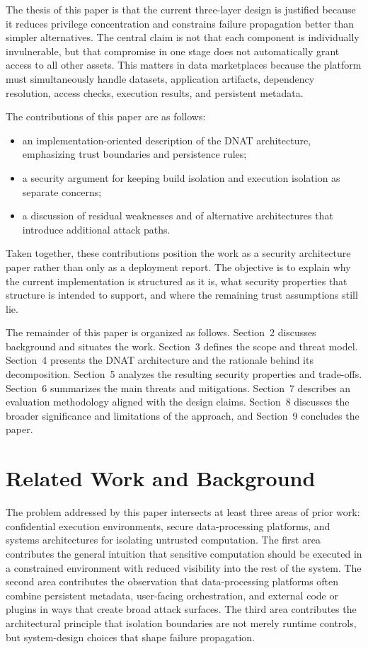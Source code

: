 \documentclass[sigconf,nonacm]{acmart}
\begin{document}
The thesis of this paper is that the current three-layer design is justified because it reduces privilege concentration and constrains failure propagation better than simpler alternatives. The central claim is not that each component is individually invulnerable, but that compromise in one stage does not automatically grant access to all other assets. This matters in data marketplaces because the platform must simultaneously handle datasets, application artifacts, dependency resolution, access checks, execution results, and persistent metadata.

The contributions of this paper are as follows:
\begin{itemize}
\item an implementation-oriented description of the DNAT architecture, emphasizing trust boundaries and persistence rules;
\item a security argument for keeping build isolation and execution isolation as separate concerns;
\item a discussion of residual weaknesses and of alternative architectures that introduce additional attack paths.
\end{itemize}

Taken together, these contributions position the work as a security architecture paper rather than only as a deployment report. The objective is to explain why the current implementation is structured as it is, what security properties that structure is intended to support, and where the remaining trust assumptions still lie.

The remainder of this paper is organized as follows. Section~2 discusses background and situates the work. Section~3 defines the scope and threat model. Section~4 presents the DNAT architecture and the rationale behind its decomposition. Section~5 analyzes the resulting security properties and trade-offs. Section~6 summarizes the main threats and mitigations. Section~7 describes an evaluation methodology aligned with the design claims. Section~8 discusses the broader significance and limitations of the approach, and Section~9 concludes the paper.

\section{Related Work and Background}

The problem addressed by this paper intersects at least three areas of prior work: confidential execution environments, secure data-processing platforms, and systems architectures for isolating untrusted computation. The first area contributes the general intuition that sensitive computation should be executed in a constrained environment with reduced visibility into the rest of the system. The second area contributes the observation that data-processing platforms often combine persistent metadata, user-facing orchestration, and external code or plugins in ways that create broad attack surfaces. The third area contributes the architectural principle that isolation boundaries are not merely runtime controls, but system-design choices that shape failure propagation.
\end{document}
